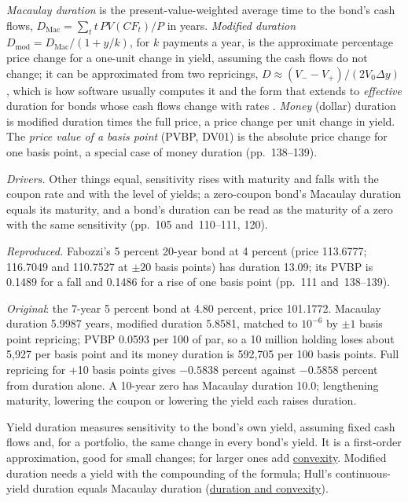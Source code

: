 \begin{qfmethod}\label{meth:yield-duration-pvbp}
 \emph{Macaulay duration} is the present-value-weighted average time to the bond's cash flows, $D_{\text{Mac}}=\sum_t t\,PV(CF_t)/P$ in years. \emph{Modified duration} $D_{\text{mod}}=D_{\text{Mac}}/(1+y/k)$, for $k$ payments a year, is the approximate percentage price change for a one-unit change in yield, assuming the cash flows do not change; it can be approximated from two repricings, $D\approx(V_- - V_+)/(2V_0\Delta y)$, which is how software usually computes it and the form that extends to \emph{effective} duration for bonds whose cash flows change with rates \citep[chap.~5, pp.~111--112 and~117--120]{s7-fabozzifixed}. \emph{Money} (dollar) duration is modified duration times the full price, a price change per unit change in yield. The \emph{price value of a basis point} (PVBP, DV01) is the absolute price change for one basis point, a special case of money duration (pp.~138--139).

\emph{Drivers.} Other things equal, sensitivity rises with maturity and falls with the coupon rate and with the level of yields; a zero-coupon bond's Macaulay duration equals its maturity, and a bond's duration can be read as the maturity of a zero with the same sensitivity (pp.~105 and~110--111, 120).

 \emph{Reproduced.} Fabozzi's 5 percent 20-year bond at 4 percent (price 113.6777; 116.7049 and 110.7527 at $\pm20$ basis points) has duration 13.09; its PVBP is 0.1489 for a fall and 0.1486 for a rise of one basis point (pp.~111 and~138--139).

\emph{Original}: the 7-year 5 percent bond at 4.80 percent, price 101.1772. Macaulay duration 5.9987 years, modified duration 5.8581, matched to $10^{-6}$ by $\pm1$ basis point repricing; PVBP 0.0593 per 100 of par, so a 10 million holding loses about 5{,}927 per basis point and its money duration is 592{,}705 per 100 basis points. Full repricing for +10 basis points gives $-0.5838$ percent against $-0.5858$ percent from duration alone. A 10-year zero has Macaulay duration 10.0; lengthening maturity, lowering the coupon or lowering the yield each raises duration.

 Yield duration measures sensitivity to the bond's own yield, assuming fixed cash flows and, for a portfolio, the same change in every bond's yield. It is a first-order approximation, good for small changes; for larger ones add \hyperref[meth:convexity-portfolio-duration]{convexity}. Modified duration needs a yield with the compounding of the formula; Hull's continuous-yield duration equals Macaulay duration (\hyperref[mod:duration-convexity]{duration and convexity}).


\end{qfmethod}
